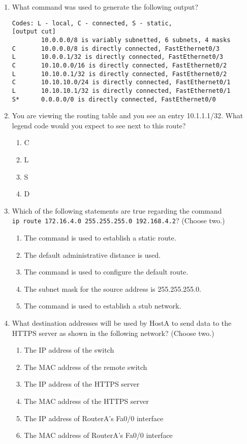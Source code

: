 \begin{enumerate}
\item
  What command was used to generate the following output?

\begin{verbatim}
Codes: L - local, C - connected, S - static,
[output cut]
        10.0.0.0/8 is variably subnetted, 6 subnets, 4 masks
C       10.0.0.0/8 is directly connected, FastEthernet0/3
L       10.0.0.1/32 is directly connected, FastEthernet0/3
C       10.10.0.0/16 is directly connected, FastEthernet0/2
L       10.10.0.1/32 is directly connected, FastEthernet0/2
C       10.10.10.0/24 is directly connected, FastEthernet0/1
L       10.10.10.1/32 is directly connected, FastEthernet0/1
S*      0.0.0.0/0 is directly connected, FastEthernet0/0
\end{verbatim}
\item
  You are viewing the routing table and you see an entry 10.1.1.1/32.
  What legend code would you expect to see next to this route?

  \begin{enumerate}
  \tightlist
  \item
    C
  \item
    L
  \item
    S
  \item
    D
  \end{enumerate}
\item
  Which of the following statements are true regarding the command
  \texttt{ip\ route\ 172.16.4.0\ 255.255.255.0\ 192.168.4.2}? (Choose
  two.)

  \begin{enumerate}
  \tightlist
  \item
    The command is used to establish a static route.
  \item
    The default administrative distance is used.
  \item
    The command is used to configure the default route.
  \item
    The subnet mask for the source address is 255.255.255.0.
  \item
    The command is used to establish a stub network.
  \end{enumerate}
\item
  What destination addresses will be used by HostA to send data to the
  HTTPS server as shown in the following network? (Choose two.)

  \begin{enumerate}
  \item
    The IP address of the switch
  \item
    The MAC address of the remote switch
  \item
    The IP address of the HTTPS server
  \item
    \protect\hypertarget{c09.xhtmlux5cux23Page_406}{}{}The MAC address
    of the HTTPS server
  \item
    The IP address of RouterA's Fa0/0 interface
  \item
    The MAC address of RouterA's Fa0/0 interface


\end{enumerate}
\end{enumerate}
